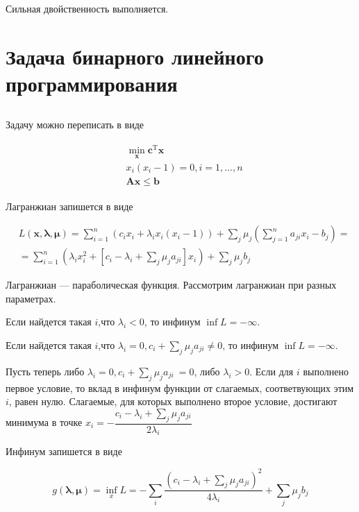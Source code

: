 	Сильная двойственность выполняется.
	
	\section{Задача бинарного линейного программирования}
	
	\subsection{}
	
	Задачу можно переписать в виде
	
	\begin{align}
	\begin{aligned}
	&\min_{\mathbf{x}} \mathbf{c}^{\text{T}}\mathbf{x} \\
	&x_i(x_i-1) = 0, i= 1,...,n\\
	&\mathbf{A}\mathbf{x} \leqslant \mathbf{b}
	\end{aligned}
	\end{align}
	
	Лагранжиан запишется в виде
	
	\begin{align}
	&L(\mathbf{x},\boldsymbol{\lambda},\boldsymbol{\mu}) = \sum\limits_{i=1}^{n}\left( c_i x_i + \lambda_i x_i(x_i-1)\right) + \sum\limits_{j}\mu_j (\sum\limits_{j=1}^{n}a_{ji}x_i - b_j) = \\
	&= \sum\limits_{i=1}^{n} \left(\lambda_i x_i^2 + \left[ c_i-\lambda_i + \sum\limits_{j}\mu_j a_{ji}\right] x_i \right)  + \sum\limits_{j}\mu_j b_j
	\end{align}
	
	Лагранжиан --- параболическая функция. Рассмотрим лагранжиан при разных параметрах.
	
	Если найдется такая $i$,что $\lambda_i < 0$, то инфинум $\inf L = -\infty$. 
	
	Если найдется такая $i$,что $\lambda_i = 0, c_i + \sum_j \mu_j a_{ji} \neq 0$, то инфинум $\inf L = -\infty$.  
	
	Пусть теперь либо $\lambda_i = 0, c_i + \sum_j \mu_j a_{ji} \ = 0$, либо $\lambda_i > 0$. Если для $i$ выполнено первое условие, то вклад в инфинум функции от слагаемых, соответвующих этим $i$, равен нулю. Слагаемые, для которых выполнено второе условие, достигают минимума в точке $x_i = -\dfrac{ c_i-\lambda_i + \sum\limits_{j}\mu_j a_{ji}}{2\lambda_i}$
	
	Инфинум запишется в виде
	
	\begin{equation}
	\label{5doublefunc}
	g(\boldsymbol{\lambda},\boldsymbol{\mu}) = \inf_x L = -\sum_i \frac{\left(  c_i-\lambda_i + \sum\limits_{j}\mu_j a_{ji}\right)^2 }{4\lambda_i} + \sum_j \mu_j b_j
	\end{equation}
	
